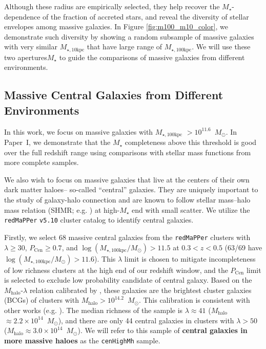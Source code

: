 \documentclass[a4paper,fleqn,usenatbib]{mnras}
\def\msun{$M_\odot$}
\def\redm{\texttt{redMaPPer}}
\def\rbcg{\texttt{cenHighMh}}
\def\mstar{{$M_{\star}$}}
\def\mhalo{{$M_{\mathrm{halo}}$}}
\def\minn{{$M_{\star,10\mathrm{kpc}}$}}
\def\mtot{{$M_{\star,100\mathrm{kpc}}$}}
\def\logmtot{{$\log (M_{\star,100\mathrm{kpc}}/M_{\odot})$}}
\begin{document}
   Although these radius are empirically selected, they help recover the 
   \mstar{}-dependence of the fraction of accreted stars, and reveal the diversity of 
   stellar envelopes among massive galaxies. 
   In Figure \ref{fig:m100_m10_color}, we demonstrate such diversity by showing 
   a random subsample of massive galaxies with very similar \minn{} that have large 
   range of \mtot{}. 
   We will use these two apertures\mstar{} to guide the comparisons of massive galaxies 
   from different environments.  
    
\subsection{Massive Central Galaxies from Different Environments}
    \label{ssec:cen}
         
    In this work, we focus on massive galaxies with \mtot{} $>10^{11.6}$~\msun{}. 
    In Paper~I, we demonstrate that the \mstar{} completeness above this threshold is 
    good over the full redshift range using comparisons with stellar mass functions 
    from more complete samples.
    
    We also wish to focus on massive galaxies that live at the centers of their own 
    dark matter haloes-- so-called ``central'' galaxies.  
    They are uniquely important to the study of galaxy-halo connection and are known 
    to follow stellar mass--halo mass relation (SHMR; e.g. \citealt{Leauthaud2012, 
    Behroozi2013, Kravtsov2014, Tinker2017}) at high-\mstar{} end with small scatter.
    We utilize the \redm{} \texttt{v5.10} \citep{Rykoff2014, Rozo2015b} cluster catalog 
    to identify central galaxies. 
    
    Firstly, we select 68 massive central galaxies from the \redm{} clusters 
    with $\lambda \geq 30$, $P_{\mathrm{Cen}} \geq 0.7$, and \logmtot{}$>11.5$ 
    at $0.3 < z < 0.5$ (63/69 have \logmtot{}$>11.6$). 
    This $\lambda$ limit is chosen to mitigate incompleteness of low richness clusters
    at the high end of our redshift window, and the $P_{\mathrm{Cen}}$ limit is 
    selected to exclude low probability candidate of central galaxy. 
    Based on the \mhalo{}-$\lambda$ relation calibrated by \citet{Simet2016}, these 
    galaxies are the brightest cluster galaxies (BCGs) of clusters with 
    \mhalo{}$>10^{14.2}$~\msun{}.
    This calibration is consistent with other works (e.g. \citealt{Saro2015, Farahi2016, 
    Melchior2016, Murata2017}). 
    The median richness of the sample is $\lambda \approx 41$ 
    (\mhalo{}$\approx 2.2 \times 10^{14}$~\msun{}), and there are 
    only 44 central galaxies in clusters with $\lambda>50$ 
    (\mhalo{}$\approx 3.0 \times 10^{14}$~\msun{}).
    We will refer to this sample of \textbf{central galaxies in more massive haloes} as 
    the \rbcg{} sample.
    
\end{document}
